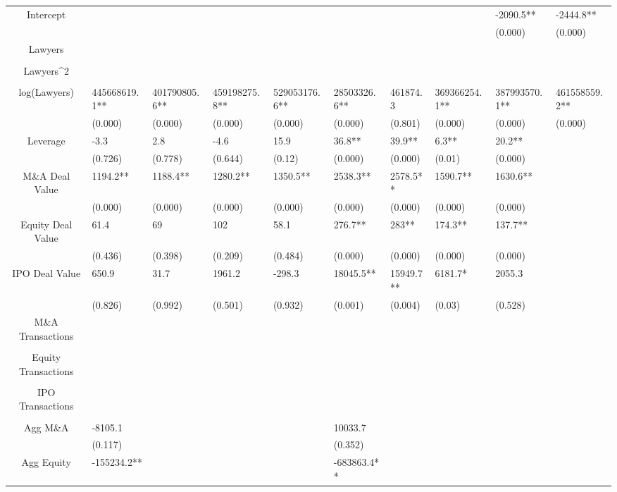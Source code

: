 \documentclass{article}
\begin{document}
\begin{table}[H]
\begin{tabular}{|clllllllll|}
Intercept &  &  &  &  &  &  &  & -2090.5** & -2444.8** \\ 
   &  &  &  &  &  &  &  & (0.000) & (0.000) \\ 
  Lawyers &  &  &  &  &  &  &  &  &  \\ 
   &  &  &  &  &  &  &  &  &  \\ 
  Lawyers^2 &  &  &  &  &  &  &  &  &  \\ 
   &  &  &  &  &  &  &  &  &  \\ 
  log(Lawyers) & 445668619.1** & 401790805.6** & 459198275.8** & 529053176.6** & 28503326.6** & 461874.3 & 369366254.1** & 387993570.1** & 461558559.2** \\ 
   & (0.000) & (0.000) & (0.000) & (0.000) & (0.000) & (0.801) & (0.000) & (0.000) & (0.000) \\ 
  Leverage & -3.3 & 2.8 & -4.6 & 15.9 & 36.8** & 39.9** & 6.3** & 20.2** &  \\ 
   & (0.726) & (0.778) & (0.644) & (0.12) & (0.000) & (0.000) & (0.01) & (0.000) &  \\ 
  M\&A Deal Value & 1194.2** & 1188.4** & 1280.2** & 1350.5** & 2538.3** & 2578.5** & 1590.7** & 1630.6** &  \\ 
   & (0.000) & (0.000) & (0.000) & (0.000) & (0.000) & (0.000) & (0.000) & (0.000) &  \\ 
  Equity Deal Value & 61.4 & 69 & 102 & 58.1 & 276.7** & 283** & 174.3** & 137.7** &  \\ 
   & (0.436) & (0.398) & (0.209) & (0.484) & (0.000) & (0.000) & (0.000) & (0.000) &  \\ 
  IPO Deal Value & 650.9 & 31.7 & 1961.2 & -298.3 & 18045.5** & 15949.7** & 6181.7* & 2055.3 &  \\ 
   & (0.826) & (0.992) & (0.501) & (0.932) & (0.001) & (0.004) & (0.03) & (0.528) &  \\ 
  M\&A Transactions &  &  &  &  &  &  &  &  &  \\ 
   &  &  &  &  &  &  &  &  &  \\ 
  Equity Transactions &  &  &  &  &  &  &  &  &  \\ 
   &  &  &  &  &  &  &  &  &  \\ 
  IPO Transactions &  &  &  &  &  &  &  &  &  \\ 
   &  &  &  &  &  &  &  &  &  \\ 
  Agg M\&A & -8105.1 &  &  &  & 10033.7 &  &  &  &  \\ 
   & (0.117) &  &  &  & (0.352) &  &  &  &  \\ 
  Agg Equity & -155234.2** &  &  &  & -683863.4** &  &  &  &  \\ 

\end{tabular}
\end{table}
\end{document}

